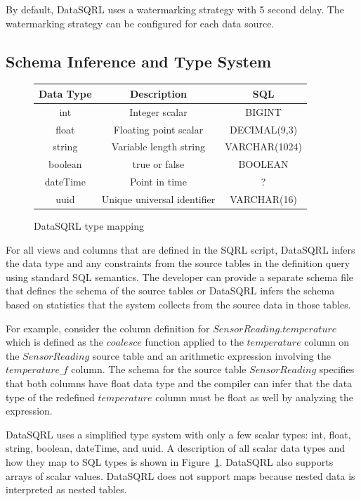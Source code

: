 \documentclass[	DIV=calc,%
							paper=letter,%
							fontsize=11pt,%
							twocolumn]{scrartcl}	 					%
\begin{document}
By default, DataSQRL uses a watermarking strategy with 5 second delay. The watermarking strategy can be configured for each data source.

\subsection{Schema Inference and Type System}

\begin{figure}[ht]
\begin{center}
\begin{tabular}{|c c c|}
 \hline
 Data Type & Description & SQL \\
 \hline
 int & Integer scalar & BIGINT \\
 float & Floating point scalar & DECIMAL(9,3) \\
 string & Variable length string & VARCHAR(1024) \\
 boolean & true or false & BOOLEAN \\
 dateTime & Point in time & ? \\
 uuid & Unique universal identifier & VARCHAR(16) \\
 \hline
\end{tabular}
\end{center}
\caption{DataSQRL type mapping}
\label{tbl:datatypes}
\end{figure}

For all views and columns that are defined in the SQRL script, DataSQRL infers the data type and any constraints from the source tables in the definition query using standard SQL semantics. The developer can provide a separate schema file that defines the schema of the source tables or DataSQRL infers the schema based on statistics that the system collects from the source data in those tables.

For example, consider the column definition for $SensorReading.temperature$ which is defined as the $coalesce$ function applied to the $temperature$ column on the $SensorReading$ source table and an arithmetic expression involving the $temperature\_f$ column. The schema for the source table $SensorReading$ specifies that both columns have float data type and the compiler can infer that the data type of the redefined $temperature$ column must be float as well by analyzing the expression.

DataSQRL uses a simplified type system with only a few scalar types: int, float, string, boolean, dateTime, and uuid. A description of all scalar data types and how they map to SQL types is shown in Figure~\ref{tbl:datatypes}. DataSQRL also supports arrays of scalar values. DataSQRL does not support maps because nested data is interpreted as nested tables.
\end{document}

